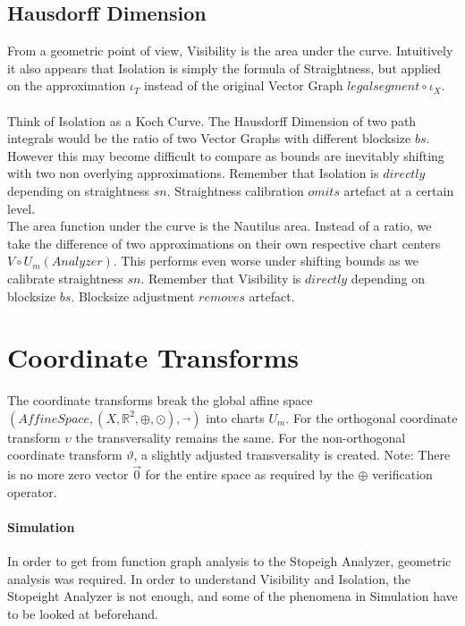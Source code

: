 \documentclass{report}
\begin{document}
\section{Hausdorff Dimension}

From a geometric point of view, Visibility is the area under the curve. Intuitively it also appears that Isolation is simply the formula of Straightness, but applied on the approximation $\iota_{T}$ instead of the original Vector Graph $legalsegment \circ \iota_{X}$.\\\\
Think of Isolation as a Koch Curve. The Hausdorff Dimension of two path integrals would be the ratio of two Vector Graphs with different blocksize $bs$. However this may become difficult to compare as bounds are inevitably shifting with two non overlying approximations. Remember that Isolation is $directly$ depending on straightness $sn$. Straightness calibration $omits$ artefact at a certain level.\\
The area function under the curve is the Nautilus area. Instead of a ratio, we take the difference of two approximations on their own respective chart centers $V\circ U_{m}(Analyzer)$. This performs even worse under shifting bounds as we calibrate straightness $sn$. Remember that Visibility is $directly$ depending on blocksize $bs$. Blocksize adjustment $removes$ artefact.

\chapter{Coordinate Transforms}
The coordinate transforms break the global affine space $(AffineSpace,(X,\mathbb{R}^2,\oplus,\odot),\overrightarrow{\text{ }})$ into charts $U_{m}$. For the orthogonal coordinate transform $\upsilon$ the transversality remains the same. For the non-orthogonal coordinate transform $\vartheta$, a slightly adjusted transversality is created.
Note: There is no more zero vector $\overrightarrow{0}$ for the entire space as required by the $\oplus$ verification operator.

\subsubsection*{Simulation}
In order to get from function graph analysis to the Stopeigh Analyzer, geometric analysis was required. In order to understand Visibility and Isolation, the Stopeight Analyzer is not enough, and some of the phenomena in Simulation have to be looked at beforehand.
\end{document}

